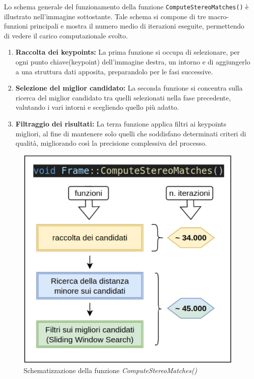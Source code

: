 \documentclass[12pt,a4paper]{report}
\begin{document}
Lo schema generale del funzionamento della funzione \texttt{ComputeStereoMatches()} è illustrato nell'immagine sottostante. Tale schema si compone di tre macro-funzioni principali e mostra il numero medio di iterazioni eseguite, permettendo di vedere il carico computazionale svolto.

\begin{enumerate}
    \item \textbf{Raccolta dei keypoints:} La prima funzione si occupa di selezionare, per ogni punto chiave(keypoint) dell'immagine destra, un intorno e di aggiungerlo a una struttura dati apposita, preparandolo per le fasi successive.
    \item \textbf{Selezione del miglior candidato:} La seconda funzione si concentra sulla ricerca del miglior candidato tra quelli selezionati nella fase precedente, valutando i vari intorni e scegliendo quello più adatto.
    \item \textbf{Filtraggio dei risultati:} La terza funzione applica filtri ai keypoints migliori, al fine di mantenere solo quelli che soddisfano determinati criteri di qualità, migliorando così la precisione complessiva del processo.
\end{enumerate}

\begin{figure}[H]
    \centering
    \includegraphics[width=0.8\linewidth]{img/ComputeStereo_schema.png}
    \caption{Schematizzazione della funzione \textit{ComputeStereoMatches()} }
\end{figure}
\end{document}
